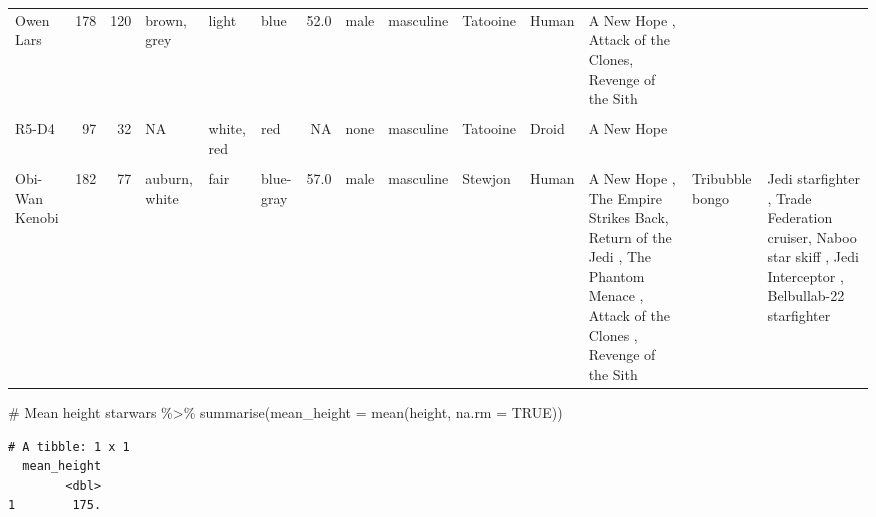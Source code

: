\documentclass[
  man,
  floatsintext,
  longtable,
  nolmodern,
  notxfonts,
  notimes,
  colorlinks=true,linkcolor=blue,citecolor=blue,urlcolor=blue]{apa7}
\newenvironment{Shaded}{\begin{snugshade}}{\end{snugshade}}
\newcommand{\AttributeTok}[1]{\textcolor[rgb]{0.40,0.45,0.13}{#1}}
\newcommand{\CommentTok}[1]{\textcolor[rgb]{0.37,0.37,0.37}{#1}}
\newcommand{\ConstantTok}[1]{\textcolor[rgb]{0.56,0.35,0.01}{#1}}
\newcommand{\FunctionTok}[1]{\textcolor[rgb]{0.28,0.35,0.67}{#1}}
\newcommand{\NormalTok}[1]{\textcolor[rgb]{0.00,0.23,0.31}{#1}}
\newcommand{\SpecialCharTok}[1]{\textcolor[rgb]{0.37,0.37,0.37}{#1}}
\begin{document}
\begin{table}
\begin{tabular}[t]{lrrlllrlllllll}
\addlinespace
Owen Lars & 178 & 120 & brown, grey & light & blue & 52.0 & male & masculine & Tatooine & Human & A New Hope          , Attack of the Clones, Revenge of the Sith &  & \\
\cellcolor{gray!10}{Beru Whitesun Lars} & \cellcolor{gray!10}{165} & \cellcolor{gray!10}{75} & \cellcolor{gray!10}{brown} & \cellcolor{gray!10}{light} & \cellcolor{gray!10}{blue} & \cellcolor{gray!10}{47.0} & \cellcolor{gray!10}{female} & \cellcolor{gray!10}{feminine} & \cellcolor{gray!10}{Tatooine} & \cellcolor{gray!10}{Human} & \cellcolor{gray!10}{A New Hope          , Attack of the Clones, Revenge of the Sith} & \cellcolor{gray!10}{} & \cellcolor{gray!10}{}\\
R5-D4 & 97 & 32 & NA & white, red & red & NA & none & masculine & Tatooine & Droid & A New Hope &  & \\
\cellcolor{gray!10}{Biggs Darklighter} & \cellcolor{gray!10}{183} & \cellcolor{gray!10}{84} & \cellcolor{gray!10}{black} & \cellcolor{gray!10}{light} & \cellcolor{gray!10}{brown} & \cellcolor{gray!10}{24.0} & \cellcolor{gray!10}{male} & \cellcolor{gray!10}{masculine} & \cellcolor{gray!10}{Tatooine} & \cellcolor{gray!10}{Human} & \cellcolor{gray!10}{A New Hope} & \cellcolor{gray!10}{} & \cellcolor{gray!10}{X-wing}\\
Obi-Wan Kenobi & 182 & 77 & auburn, white & fair & blue-gray & 57.0 & male & masculine & Stewjon & Human & A New Hope             , The Empire Strikes Back, Return of the Jedi     , The Phantom Menace     , Attack of the Clones   , Revenge of the Sith & Tribubble bongo & Jedi starfighter        , Trade Federation cruiser, Naboo star skiff        , Jedi Interceptor        , Belbullab-22 starfighter\\
\bottomrule
\end{tabular}
\end{table}

\begin{Shaded}
\begin{Highlighting}[]
\CommentTok{\# Mean height}
\NormalTok{starwars }\SpecialCharTok{\%\textgreater{}\%} 
  \FunctionTok{summarise}\NormalTok{(}\AttributeTok{mean\_height =} \FunctionTok{mean}\NormalTok{(height, }\AttributeTok{na.rm =} \ConstantTok{TRUE}\NormalTok{))}
\end{Highlighting}
\end{Shaded}

\begin{verbatim}
# A tibble: 1 x 1
  mean_height
        <dbl>
1        175.
\end{verbatim}
\end{document}
